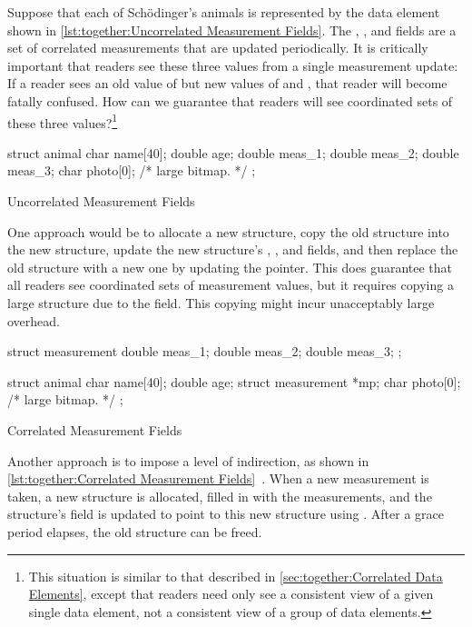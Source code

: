 Suppose that each of Sch\"odinger's animals is represented by the
data element shown in
\cref{lst:together:Uncorrelated Measurement Fields}.
The , , and  fields are a set
of correlated measurements that are updated periodically.
It is critically important that readers see these three values from
a single measurement update: If a reader sees an old value of
 but new values of  and , that
reader will become fatally confused.
How can we guarantee that readers will see coordinated sets of these
three values?\footnote{
	This situation is similar to that described in
	\cref{sec:together:Correlated Data Elements},
	except that readers need only see a consistent view of a
	given single data element, not a consistent view of a
	group of data elements.}

\begin{listing}[tbp]
\begin{VerbatimL}[tabsize=8]
struct animal {
	char name[40];
	double age;
	double meas_1;
	double meas_2;
	double meas_3;
	char photo[0]; /* large bitmap. */
};
\end{VerbatimL}
\caption{Uncorrelated Measurement Fields}
\label{lst:together:Uncorrelated Measurement Fields}
\end{listing}

One approach would be to allocate a new  structure,
copy the old structure into the new structure, update the new
structure's , , and  fields,
and then replace the old structure with a new one by updating
the pointer.
This does guarantee that all readers see coordinated sets of
measurement values, but it requires copying a large structure due
to the  field.
This copying might incur unacceptably large overhead.

\begin{listing}[tbp]
\begin{VerbatimL}[tabsize=8]
struct measurement {
	double meas_1;
	double meas_2;
	double meas_3;
};

struct animal {
	char name[40];
	double age;
	struct measurement *mp;
	char photo[0]; /* large bitmap. */
};
\end{VerbatimL}
\caption{Correlated Measurement Fields}
\label{lst:together:Correlated Measurement Fields}
\end{listing}

Another approach is to impose a level of indirection, as shown in
\cref{lst:together:Correlated Measurement Fields}~\cite[Section 5.3.4]{PaulEdwardMcKenneyPhD}.
When a new measurement is taken, a new  structure
is allocated, filled in with the measurements, and the 
structure's  field is updated to point to this new
 structure using .
After a grace period elapses, the old  structure
can be freed.


